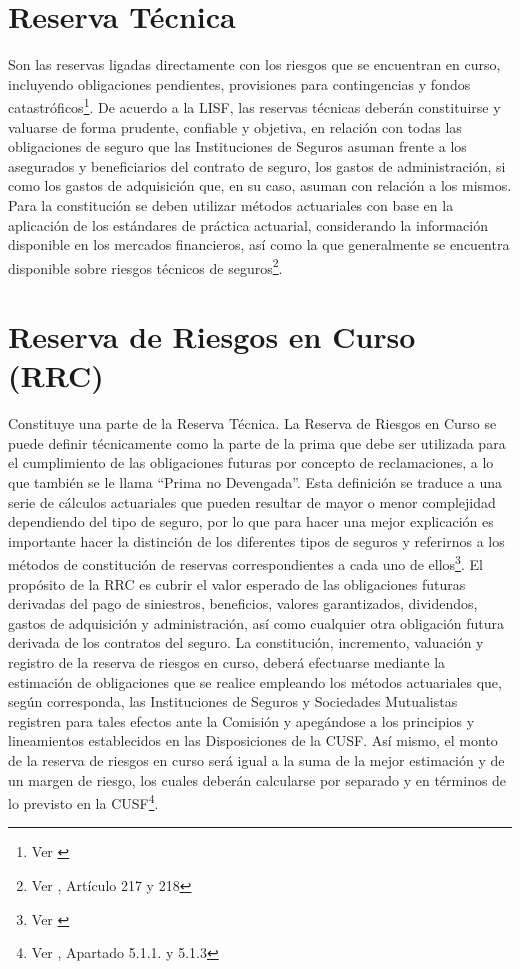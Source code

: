 \documentclass[11pt,twoside,openright,spanish]{report}
\numberwithin{equation}{chapter}
\numberwithin{figure}{chapter}
\numberwithin{table}{chapter}
\begin{document}
	\section{Reserva Técnica}
Son las reservas ligadas directamente con los riesgos que se encuentran en curso, incluyendo obligaciones pendientes, provisiones para contingencias y fondos catastróficos\footnote{Ver \citet{RResAssal}}.
De acuerdo a la LISF, las reservas técnicas deberán constituirse y valuarse de forma prudente, confiable y objetiva, en relación con todas las obligaciones de seguro que las Instituciones de Seguros asuman frente a los asegurados y beneficiarios del contrato de seguro, los gastos de administración, si como los gastos de adquisición que, en su caso, asuman con relación a los mismos. Para la constitución se deben utilizar métodos actuariales con base en la aplicación de los estándares de práctica actuarial, considerando la información disponible en los mercados financieros, así como la que generalmente se encuentra disponible sobre riesgos técnicos de seguros\footnote{Ver \citet{DReservasTec}, Artículo 217 y 218}. 


	\section{Reserva de Riesgos en Curso (RRC)}
Constituye una parte de la Reserva Técnica. La Reserva de Riesgos en Curso se puede definir técnicamente como la parte de la prima que debe ser utilizada para el cumplimiento de las obligaciones futuras por concepto de reclamaciones, a lo que también se le llama 
“Prima no Devengada”. Esta definición se traduce a una serie de cálculos actuariales que pueden resultar de mayor o menor complejidad dependiendo del tipo de seguro, por lo que para hacer una mejor explicación es importante hacer la distinción de los diferentes tipos de seguros y referirnos a los métodos de constitución de reservas correspondientes a cada uno de ellos\footnote{Ver \citet{RResAssal}}. El propósito de la RRC es cubrir el valor esperado de las obligaciones futuras derivadas del pago de siniestros, beneficios, valores garantizados, dividendos, gastos de adquisición y administración, así como cualquier otra obligación futura derivada de los contratos del seguro.
La constitución, incremento, valuación y registro de la reserva de riesgos en curso, deberá efectuarse mediante la estimación de obligaciones que se realice empleando los métodos actuariales que, según corresponda, las Instituciones de Seguros y Sociedades Mutualistas registren para tales efectos ante la Comisión y apegándose a los principios y lineamientos establecidos en las Disposiciones de la CUSF. Así mismo, el monto de la reserva de riesgos en curso será igual a la suma de la mejor estimación y de un margen de riesgo, los cuales deberán calcularse por separado y en términos de lo previsto en la CUSF\footnote{Ver \citet{HCusf}, Apartado 5.1.1. y 5.1.3}.
 
\end{document}
